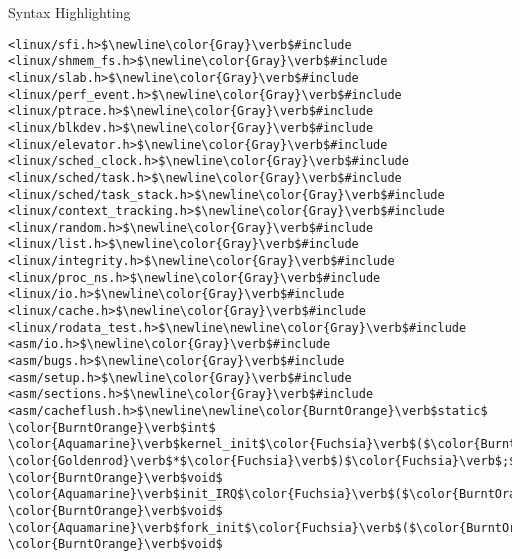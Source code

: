 \begin{frame}{Syntax Highlighting}
\begin{verbatim}
<linux/sfi.h>$\newline\color{Gray}\verb$#include <linux/shmem_fs.h>$\newline\color{Gray}\verb$#include <linux/slab.h>$\newline\color{Gray}\verb$#include <linux/perf_event.h>$\newline\color{Gray}\verb$#include <linux/ptrace.h>$\newline\color{Gray}\verb$#include <linux/blkdev.h>$\newline\color{Gray}\verb$#include <linux/elevator.h>$\newline\color{Gray}\verb$#include <linux/sched_clock.h>$\newline\color{Gray}\verb$#include <linux/sched/task.h>$\newline\color{Gray}\verb$#include <linux/sched/task_stack.h>$\newline\color{Gray}\verb$#include <linux/context_tracking.h>$\newline\color{Gray}\verb$#include <linux/random.h>$\newline\color{Gray}\verb$#include <linux/list.h>$\newline\color{Gray}\verb$#include <linux/integrity.h>$\newline\color{Gray}\verb$#include <linux/proc_ns.h>$\newline\color{Gray}\verb$#include <linux/io.h>$\newline\color{Gray}\verb$#include <linux/cache.h>$\newline\color{Gray}\verb$#include <linux/rodata_test.h>$\newline\newline\color{Gray}\verb$#include <asm/io.h>$\newline\color{Gray}\verb$#include <asm/bugs.h>$\newline\color{Gray}\verb$#include <asm/setup.h>$\newline\color{Gray}\verb$#include <asm/sections.h>$\newline\color{Gray}\verb$#include <asm/cacheflush.h>$\newline\newline\color{BurntOrange}\verb$static$ \color{BurntOrange}\verb$int$ \color{Aquamarine}\verb$kernel_init$\color{Fuchsia}\verb$($\color{BurntOrange}\verb$void$ \color{Goldenrod}\verb$*$\color{Fuchsia}\verb$)$\color{Fuchsia}\verb$;$\newline\newline\color{BurntOrange}\verb$extern$ \color{BurntOrange}\verb$void$ \color{Aquamarine}\verb$init_IRQ$\color{Fuchsia}\verb$($\color{BurntOrange}\verb$void$\color{Fuchsia}\verb$)$\color{Fuchsia}\verb$;$\newline\color{BurntOrange}\verb$extern$ \color{BurntOrange}\verb$void$ \color{Aquamarine}\verb$fork_init$\color{Fuchsia}\verb$($\color{BurntOrange}\verb$void$\color{Fuchsia}\verb$)$\color{Fuchsia}\verb$;$\newline\color{BurntOrange}\verb$extern$ \color{BurntOrange}\verb$void$ 
\end{verbatim}
\end{frame}
